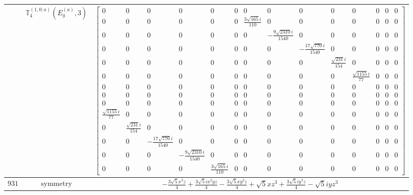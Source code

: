 \documentclass[fleqn,8pt,landscape]{jsarticle}
\begin{document}
\begin{longtable}{ccc}
$  $ & $ \mathbb{T}_{4}^{(1,0;a)}(E_{g}^{(a)},3) $ & $ \begin{bmatrix} 0 & 0 & 0 & 0 & 0 & 0 & 0 & 0 & 0 & 0 & 0 & 0 & 0 & 0 \\ 0 & 0 & 0 & 0 & 0 & 0 & \frac{3 \sqrt{165} i}{110} & 0 & 0 & 0 & 0 & 0 & 0 & 0 \\ 0 & 0 & 0 & 0 & 0 & 0 & 0 & - \frac{9 \sqrt{2310} i}{1540} & 0 & 0 & 0 & 0 & 0 & 0 \\ 0 & 0 & 0 & 0 & 0 & 0 & 0 & 0 & - \frac{17 \sqrt{770} i}{1540} & 0 & 0 & 0 & 0 & 0 \\ 0 & 0 & 0 & 0 & 0 & 0 & 0 & 0 & 0 & \frac{\sqrt{231} i}{154} & 0 & 0 & 0 & 0 \\ 0 & 0 & 0 & 0 & 0 & 0 & 0 & 0 & 0 & 0 & \frac{\sqrt{1155} i}{77} & 0 & 0 & 0 \\ 0 & 0 & 0 & 0 & 0 & 0 & 0 & 0 & 0 & 0 & 0 & 0 & 0 & 0 \\ 0 & 0 & 0 & 0 & 0 & 0 & 0 & 0 & 0 & 0 & 0 & 0 & 0 & 0 \\ 0 & 0 & 0 & 0 & 0 & 0 & 0 & 0 & 0 & 0 & 0 & 0 & 0 & 0 \\ \frac{\sqrt{1155} i}{77} & 0 & 0 & 0 & 0 & 0 & 0 & 0 & 0 & 0 & 0 & 0 & 0 & 0 \\ 0 & \frac{\sqrt{231} i}{154} & 0 & 0 & 0 & 0 & 0 & 0 & 0 & 0 & 0 & 0 & 0 & 0 \\ 0 & 0 & - \frac{17 \sqrt{770} i}{1540} & 0 & 0 & 0 & 0 & 0 & 0 & 0 & 0 & 0 & 0 & 0 \\ 0 & 0 & 0 & - \frac{9 \sqrt{2310} i}{1540} & 0 & 0 & 0 & 0 & 0 & 0 & 0 & 0 & 0 & 0 \\ 0 & 0 & 0 & 0 & \frac{3 \sqrt{165} i}{110} & 0 & 0 & 0 & 0 & 0 & 0 & 0 & 0 & 0 \end{bmatrix} $ \\ \hline
$ 931 $ & $ \text{symmetry} $ & $ - \frac{3 \sqrt{5} x^{3} z}{4} + \frac{3 \sqrt{5} i x^{2} y z}{4} - \frac{3 \sqrt{5} x y^{2} z}{4} + \sqrt{5} x z^{3} + \frac{3 \sqrt{5} i y^{3} z}{4} - \sqrt{5} i y z^{3} $ \\

\end{longtable}
\end{document}
